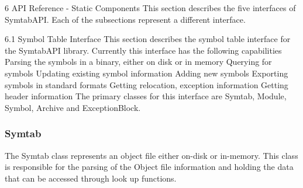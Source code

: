 6 API Reference - Static Components
This section describes the five interfaces of SymtabAPI. Each of the subsections represent a different interface.

6.1 Symbol Table Interface
This section describes the symbol table interface for the SymtabAPI library. Currently this interface has the following capabilities
Parsing the symbols in a binary, either on disk or in memory 
Querying for symbols 
Updating existing symbol information
Adding new symbols 
Exporting symbols in standard formats
Getting relocation, exception information
Getting header information
The primary classes for this interface are Symtab, Module, Symbol, Archive and ExceptionBlock.

\subsubsection{Symtab}

The Symtab class represents an object file either on-disk or in-memory. This class is responsible for the parsing of the Object file information and holding the data that can be accessed through look up functions.

